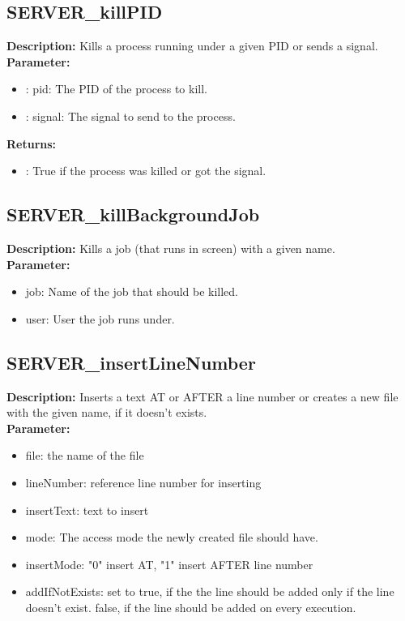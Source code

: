 \subsection{SERVER\_killPID}
\textbf{Description:} Kills a process running under a given PID or sends a signal.\\
\textbf{Parameter:}
\begin{itemize}
\item : pid: The PID of the process to kill.
\item : signal: The signal to send to the process.
\end{itemize}
\textbf{Returns:}
\begin{itemize}
\item : True if the process was killed or got the signal.
\end{itemize}

\subsection{SERVER\_killBackgroundJob}
\textbf{Description:} Kills a job (that runs in screen) with a given name.\\
\textbf{Parameter:}
\begin{itemize}
\item job: Name of the job that should be killed.
\item user: User the job runs under.
\end{itemize}

\subsection{SERVER\_insertLineNumber}
\textbf{Description:} Inserts a text AT or AFTER a line number or creates a new file with the given name, if it doesn't exists.\\
\textbf{Parameter:}
\begin{itemize}
\item file: the name of the file
\item lineNumber: reference line number for inserting
\item insertText: text to insert
\item mode: The access mode the newly created file should have.
\item insertMode: "0" insert AT, "1" insert AFTER line number
\item addIfNotExists: set to true, if the the line should be added only if the line doesn't exist. false, if the line should be added on every execution.
\end{itemize}

